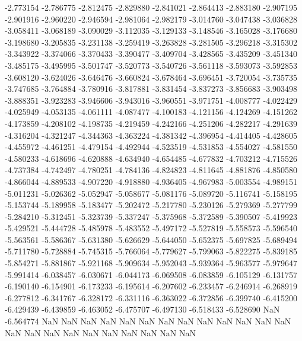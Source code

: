 -2.773154
-2.786775
-2.812475
-2.829880
-2.841021
-2.864413
-2.883180
-2.907195
-2.901916
-2.960220
-2.946594
-2.981064
-2.982179
-3.014760
-3.047438
-3.036828
-3.058411
-3.068189
-3.090029
-3.112035
-3.129133
-3.148546
-3.165028
-3.176680
-3.198680
-3.205835
-3.231138
-3.259419
-3.263828
-3.281505
-3.296218
-3.315302
-3.343922
-3.374066
-3.370433
-3.390477
-3.409704
-3.428565
-3.435209
-3.451340
-3.485175
-3.495995
-3.501747
-3.520773
-3.540726
-3.561118
-3.593073
-3.592853
-3.608120
-3.624026
-3.646476
-3.660824
-3.678464
-3.696451
-3.720054
-3.735735
-3.747685
-3.764884
-3.780916
-3.817881
-3.831454
-3.837273
-3.856683
-3.903498
-3.888351
-3.923283
-3.946606
-3.943016
-3.960551
-3.971751
-4.008777
-4.022429
-4.025949
-4.053135
-4.061111
-4.087477
-4.100183
-4.121156
-4.124269
-4.151262
-4.173859
-4.208102
-4.198735
-4.219459
-4.242166
-4.251206
-4.282217
-4.291639
-4.316204
-4.321247
-4.344363
-4.363224
-4.381342
-4.396954
-4.414405
-4.428605
-4.455972
-4.461251
-4.479154
-4.492944
-4.523519
-4.531853
-4.554027
-4.581550
-4.580233
-4.618696
-4.620888
-4.634940
-4.654485
-4.677832
-4.703212
-4.715526
-4.737384
-4.742497
-4.780251
-4.784136
-4.824823
-4.811645
-4.881876
-4.850580
-4.866044
-4.889533
-4.907220
-4.918880
-4.936405
-4.967983
-5.003554
-4.989151
-5.011231
-5.026362
-5.052947
-5.058677
-5.081176
-5.089720
-5.116741
-5.158195
-5.153744
-5.189958
-5.183477
-5.202472
-5.217780
-5.230126
-5.279369
-5.277799
-5.284210
-5.312451
-5.323739
-5.337247
-5.375968
-5.372589
-5.390507
-5.419923
-5.429521
-5.444728
-5.485978
-5.483552
-5.497172
-5.527819
-5.558573
-5.596540
-5.563561
-5.586367
-5.631380
-5.626629
-5.644050
-5.652375
-5.697825
-5.689494
-5.711780
-5.728884
-5.745315
-5.766064
-5.779627
-5.799063
-5.822275
-5.839185
-5.854271
-5.881867
-5.921168
-5.909634
-5.952043
-5.939364
-5.963577
-5.979647
-5.991414
-6.038457
-6.030671
-6.044173
-6.069508
-6.083859
-6.105129
-6.131757
-6.190140
-6.154901
-6.173233
-6.195614
-6.207602
-6.233457
-6.246914
-6.268919
-6.277812
-6.341767
-6.328172
-6.331116
-6.363022
-6.372856
-6.399740
-6.415200
-6.429439
-6.439859
-6.463052
-6.475707
-6.497130
-6.518433
-6.528690
NaN
-6.564774
NaN
NaN
NaN
NaN
NaN
NaN
NaN
NaN
NaN
NaN
NaN
NaN
NaN
NaN
NaN
NaN
NaN
NaN
NaN
NaN
NaN
NaN
NaN
